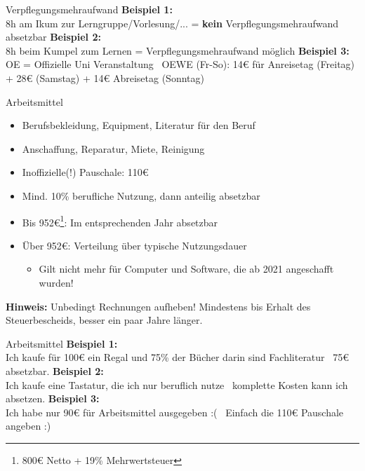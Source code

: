 \documentclass{beamer}
\begin{document}
			\begin{frame}{Verpflegungsmehraufwand}
				\textbf{Beispiel 1:}\\
				8h am Ikum zur Lerngruppe/Vorlesung/... = \textbf{kein} Verpflegungsmehraufwand absetzbar\n\pause
				\textbf{Beispiel 2:}\\
				8h beim Kumpel zum Lernen = Verpflegungsmehraufwand möglich\n\pause
				\textbf{Beispiel 3:}\\
				OE = Offizielle Uni Veranstaltung \textrightarrow\ OEWE (Fr-So): 14€ für Anreisetag (Freitag) + 28€ (Samstag) + 14€ Abreisetag (Sonntag)
			\end{frame}
		
			\begin{frame}{Arbeitsmittel}
				\begin{itemize}
					\item Berufsbekleidung, Equipment, Literatur für den Beruf
					\item Anschaffung, Reparatur, Miete, Reinigung
					\item Inoffizielle(!) Pauschale: 110€
					\item Mind. 10\% berufliche Nutzung, dann anteilig absetzbar
					\item Bis 952€\footnote{800€ Netto + 19\% Mehrwertsteuer}: Im entsprechenden Jahr absetzbar
					\item Über 952€: Verteilung über typische Nutzungsdauer
					\begin{itemize}
						\item Gilt nicht mehr für Computer und Software, die ab 2021 angeschafft wurden!
					\end{itemize}
				\end{itemize}\n\pause
			
				\textbf{Hinweis:} Unbedingt Rechnungen aufheben! Mindestens bis Erhalt des Steuerbescheids, besser ein paar Jahre länger.
			\end{frame}
		
			\begin{frame}{Arbeitsmittel}
				\textbf{Beispiel 1:}\\
				Ich kaufe für 100€ ein Regal und 75\% der Bücher darin sind Fachliteratur \textrightarrow\ 75€ absetzbar.\n\pause
				\textbf{Beispiel 2:}\\
				Ich kaufe eine Tastatur, die ich nur beruflich nutze \textrightarrow\ komplette Kosten kann ich absetzen.\n\pause
				\textbf{Beispiel 3:}\\
				Ich habe nur 90€ für Arbeitsmittel ausgegeben :( \textrightarrow\ Einfach die 110€ Pauschale angeben :)
			\end{frame}
			
\end{document}
